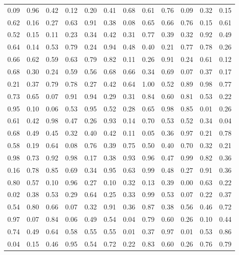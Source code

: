 \begin{center}
\begin{tabular}{llllllllllll}
0.09 & 0.96 & 0.42 & 0.12 & 0.20 & 0.41 & 0.68 & 0.61 & 0.76 & 0.09 & 0.32 & 0.15 \\
0.62 & 0.16 & 0.27 & 0.63 & 0.91 & 0.38 & 0.08 & 0.65 & 0.66 & 0.76 & 0.15 & 0.61 \\
0.52 & 0.15 & 0.11 & 0.23 & 0.34 & 0.42 & 0.31 & 0.77 & 0.39 & 0.32 & 0.92 & 0.49 \\
0.64 & 0.14 & 0.53 & 0.79 & 0.24 & 0.94 & 0.48 & 0.40 & 0.21 & 0.77 & 0.78 & 0.26 \\
0.66 & 0.62 & 0.59 & 0.63 & 0.79 & 0.82 & 0.11 & 0.26 & 0.91 & 0.24 & 0.61 & 0.12 \\
0.68 & 0.30 & 0.24 & 0.59 & 0.56 & 0.68 & 0.66 & 0.34 & 0.69 & 0.07 & 0.37 & 0.17 \\
0.21 & 0.37 & 0.79 & 0.78 & 0.27 & 0.42 & 0.64 & 1.00 & 0.52 & 0.89 & 0.98 & 0.77 \\
0.73 & 0.65 & 0.07 & 0.91 & 0.94 & 0.29 & 0.31 & 0.84 & 0.60 & 0.81 & 0.53 & 0.22 \\
0.95 & 0.10 & 0.06 & 0.53 & 0.95 & 0.52 & 0.28 & 0.65 & 0.98 & 0.85 & 0.01 & 0.26 \\
0.61 & 0.42 & 0.98 & 0.47 & 0.26 & 0.93 & 0.14 & 0.70 & 0.53 & 0.52 & 0.34 & 0.04 \\
0.68 & 0.49 & 0.45 & 0.32 & 0.40 & 0.42 & 0.11 & 0.05 & 0.36 & 0.97 & 0.21 & 0.78 \\
0.58 & 0.19 & 0.64 & 0.08 & 0.76 & 0.39 & 0.75 & 0.50 & 0.40 & 0.70 & 0.32 & 0.21 \\
0.98 & 0.73 & 0.92 & 0.98 & 0.17 & 0.38 & 0.93 & 0.96 & 0.47 & 0.99 & 0.82 & 0.36 \\
0.16 & 0.78 & 0.85 & 0.69 & 0.34 & 0.95 & 0.63 & 0.99 & 0.48 & 0.27 & 0.91 & 0.36 \\
0.80 & 0.57 & 0.10 & 0.96 & 0.27 & 0.10 & 0.32 & 0.13 & 0.39 & 0.00 & 0.63 & 0.22 \\
0.02 & 0.38 & 0.53 & 0.29 & 0.64 & 0.25 & 0.33 & 0.99 & 0.53 & 0.07 & 0.22 & 0.37 \\
0.54 & 0.80 & 0.66 & 0.07 & 0.32 & 0.91 & 0.36 & 0.87 & 0.38 & 0.56 & 0.46 & 0.72 \\
0.97 & 0.07 & 0.84 & 0.06 & 0.49 & 0.54 & 0.04 & 0.79 & 0.60 & 0.26 & 0.10 & 0.44 \\
0.74 & 0.49 & 0.64 & 0.58 & 0.55 & 0.55 & 0.01 & 0.37 & 0.97 & 0.01 & 0.53 & 0.86 \\
0.04 & 0.15 & 0.46 & 0.95 & 0.54 & 0.72 & 0.22 & 0.83 & 0.60 & 0.26 & 0.76 & 0.79
\end{tabular}
\end{center}

